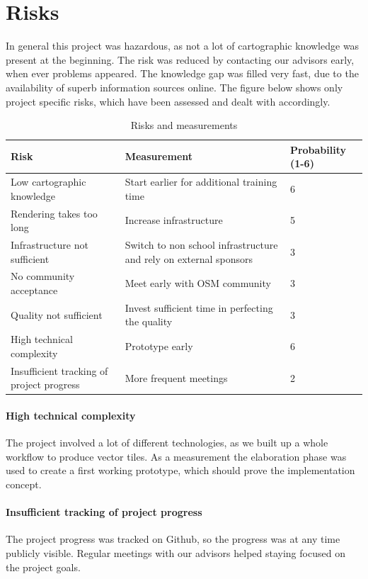 \section{Risks}\label{risks}
In general this project was hazardous, as not a lot of cartographic knowledge was present at the beginning. The risk was reduced by contacting our advisors early, when ever problems appeared. The knowledge gap was filled very fast, due to the availability of superb information sources online. The figure below shows only project specific risks, which have been assessed and dealt with accordingly.

\begin{table}[H]
\centering
    \begin{tabular}{p{3.5cm} p{7.5cm} p{1.8cm}}
    \hline
    Risk & Measurement & Probability (1-6)\\
    \hline
    Low cartographic knowledge & Start earlier for additional training time & 6\\
    Rendering takes too long & Increase infrastructure & 5\\
    Infrastructure not sufficient & Switch to non school infrastructure and rely on external sponsors & 3\\
    No community acceptance & Meet early with OSM community & 3\\
    Quality not sufficient & Invest sufficient time in perfecting the quality & 3\\
    High technical complexity & Prototype early & 6\\
    Insufficient tracking of project progress & More frequent meetings & 2\\
    \end{tabular}
    \caption{Risks and measurements}
\end{table}

\paragraph{High technical complexity} The project involved a lot of different technologies, as we built up a whole workflow to produce vector tiles. As a measurement the elaboration phase was used to create a first working prototype, which should prove the implementation concept.

\paragraph{Insufficient tracking of project progress} The project progress was tracked on Github, so the progress was at any time publicly visible. Regular meetings with our advisors helped staying focused on the project goals.


